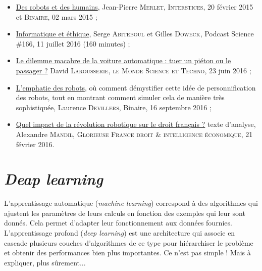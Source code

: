 \begin{gofurther}
\begin{itemize}\jazzitem
\item \href{https://www.lemonde.fr/blog/binaire/2015/03/02/des-robots-et-des-humains/}{Des robots et des humains}, Jean-Pierre \textsc{Merlet}, \textsc{Interstices}, 20 février 2015 et \textsc{Binaire}, 02 mars 2015 ;
\item \href{https://www.podcastscience.fm/emission/2016/07/11/podcast-science-266-informatique-et-ethique-avec-serge-abiteboul-et-gilles-dowek/}{Informatique et éthique}, Serge \textsc{Abiteboul} et Gilles \textsc{Doweck}, Podcast Science \#166, 11 juillet 2016 (160 minutes) ;
\item \href{https://www.lemonde.fr/sciences/article/2016/06/23/tuer-un-pieton-ou-sacrifier-le-passager-le-dilemme-macabre-des-voitures-autonomes_4956924_1650684.html}{Le dilemme macabre de la voiture automatique : tuer un piéton ou le passager ?} David \textsc{Larousserie}, \textsc{le Monde Science et Techno}, 23 juin 2016 ;
\item \href{https://www.lemonde.fr/blog/binaire/2016/09/16/laurence-devillers-lempathie-des-robots/}{L'emphatie des robots}, où comment démystifier cette idée de personnification des robots, tout en montrant comment simuler cela de manière très sophistiquée, Laurence \textsc{Devillers}, Binaire, 16 septembre 2016  ;
\item \href{http://glorieusefrance.fr/limpact-de-la-revolution-robotique-sur-le-droit/}{Quel impact de la révolution robotique sur le droit français ?} texte d'analyse, Alexandre \textsc{Mandil}, \textsc{Glorieuse France droit \& intelligence économique}, 21 février 2016.
\end{itemize}
\end{gofurther}



\section[\textit{Deap learning}]{\textit{Deap learning}}
\label{sec:III.4}

L'apprentissage automatique (\textit{machine learning}) correspond à des algorithmes qui ajustent les paramètres de leurs calculs en fonction des exemples qui leur sont donnés. Cela permet d'adapter leur fonctionnement aux données fournies. L'apprentissage profond (\textit{deep learning}) est une architecture qui associe en cascade plusieurs couches d'algorithmes de ce type pour hiérarchiser le problème et obtenir des performances bien plus importantes. Ce n'est pas simple ! Mais à expliquer, plus sûrement...



